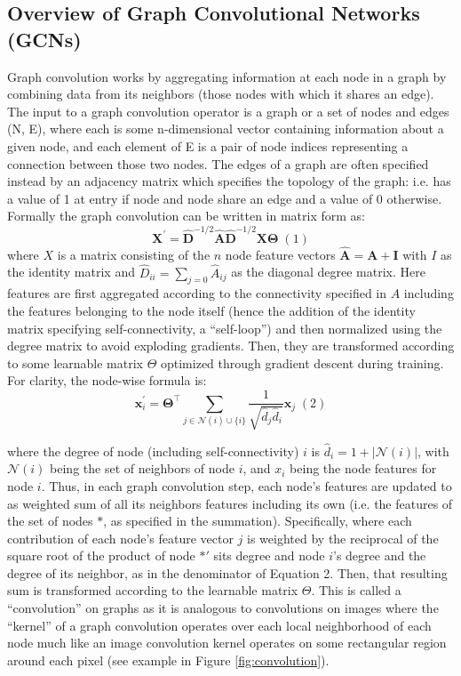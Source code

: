 \subsection{Overview of Graph Convolutional Networks (GCNs)}
Graph convolution \cite{kipfSemiSupervisedClassificationGraph2017} works by aggregating information at each node in a graph by combining data from its neighbors (those nodes with which it shares an edge). The input to a graph convolution operator is a graph or a set of nodes and edges (N, E), where each is some n-dimensional vector containing information about a given node, and each element of E is a pair of node indices representing a connection between those two nodes. The edges of a graph are often specified instead by an adjacency matrix which specifies the topology of the graph: i.e. has a value of 1 at entry if node and node share an edge and a value of 0 otherwise. Formally the graph convolution can be written in matrix form as:
$$\mathbf{X}^{\prime} = \mathbf{\hat{D}}^{-1/2}\mathbf{\hat{A}}\mathbf{\hat{D}}^{-1/2} \mathbf{X} \mathbf{\Theta} \;(1)$$
where $X$ is a matrix consisting of the $n$ node feature vectors $\mathbf{\hat{A}} = \mathbf{A} + \mathbf{I}$ with $I$ as the identity matrix and $\hat{D}_{ii} = \sum_{j=0} \hat{A}_{ij}$ as the diagonal degree matrix. Here features are first aggregated according to the connectivity specified in $A$ including the features belonging to the node itself (hence the addition of the identity matrix specifying self-connectivity, a “self-loop”) and then normalized using the degree matrix to avoid exploding gradients. Then, they are transformed according to some learnable matrix $\Theta$ optimized through gradient descent during training. For clarity, the node-wise formula is: 
$$\mathbf{x}^{\prime}_i = \mathbf{\Theta}^{\top} \sum_{j \in \mathcal{N}(i) \cup \{ i \}} \frac{1}{\sqrt{\hat{d}_j \hat{d}_i}} \mathbf{x}_j \;(2)$$

where the degree of node (including self-connectivity) $i$ is $\hat{d}_i = 1 + |\mathcal{N}(i)|$, with $\mathcal{N}(i)$ being the set of neighbors of node $i$, and $x_i$ being the node features for node $i$. Thus, in each graph convolution step, each node's features are updated to as weighted sum of all its neighbors features including its own (i.e. the features of the set of nodes $*$, as specified in the summation). Specifically, where each contribution of each node's feature vector $j$ is weighted by the reciprocal of the square root of the product of node $*'$ sits degree and node $i$'s degree and the degree of its neighbor, as in the denominator of Equation 2. Then, that resulting sum is transformed according to the learnable matrix $\Theta$. This is called a “convolution” on graphs as it is analogous to convolutions on images where the “kernel” of a graph convolution operates over each local neighborhood of each node much like an image convolution kernel operates on some rectangular region around each pixel (see example in Figure \ref{fig:convolution}). 


